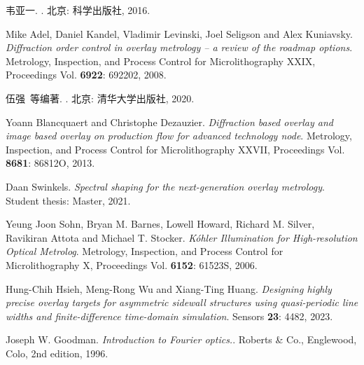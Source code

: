 {}
\begin{thebibliography}{99}

韦亚一.
.
北京: 科学出版社, 2016.

Mike Adel, Daniel Kandel, Vladimir Levinski, Joel Seligson and Alex Kuniavsky.
\textit{Diffraction order control in overlay metrology -- a review of the roadmap options}.
Metrology, Inspection, and Process Control for Microlithography XXIX, Proceedings Vol. \textbf{6922}: 692202, 2008.

伍强~等编著.
.
北京: 清华大学出版社, 2020.

Yoann Blancquaert and Christophe Dezauzier.
\textit{Diffraction based overlay and image based overlay on production flow for advanced technology node}.
Metrology, Inspection, and Process Control for Microlithography XXVII, Proceedings Vol. \textbf{8681}: 86812O, 2013.

Daan Swinkels.
\textit{Spectral shaping for the next-generation overlay metrology}.
Student thesis: Master, 2021.

Yeung Joon Sohn, Bryan M. Barnes, Lowell Howard, Richard M. Silver, Ravikiran Attota and Michael T. Stocker.
\textit{K\'{o}hler Illumination for High-resolution Optical Metrolog}.
Metrology, Inspection, and Process Control for Microlithography X, Proceedings Vol. \textbf{6152}: 61523S, 2006.

Hung-Chih Hsieh, Meng-Rong Wu and Xiang-Ting Huang.
\textit{Designing highly precise overlay targets for asymmetric sidewall structures using quasi-periodic line widths and finite-difference time-domain simulation}.
Sensors \textbf{23}: 4482, 2023.

Joseph W. Goodman.
\textit{Introduction to Fourier optics.}.
Roberts \& Co., Englewood, Colo, 2nd edition, 1996.









\end{thebibliography}